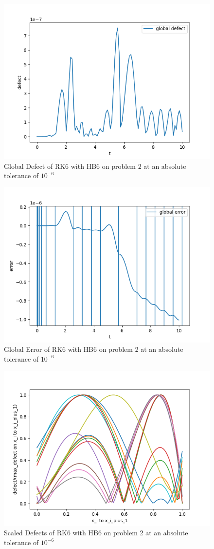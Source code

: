 \documentclass{article}
\begin{document}
\begin{figure}[H]
\centering
\includegraphics[width=0.7\linewidth]{./figures/rk6_with_hb6_p2_global_defect}
\caption{Global Defect of RK6 with HB6 on problem 2 at an absolute tolerance of $10^{-6}$}
\label{fig:rk6_with_hb6_p2_global_defect}
\end{figure}

\begin{figure}[H]
\centering
\includegraphics[width=0.7\linewidth]{./figures/rk6_with_hb6_p2_global_error}
\caption{Global Error of RK6 with HB6 on problem 2 at an absolute tolerance of $10^{-6}$}
\label{fig:rk6_with_hb6_p2_global_error}
\end{figure}

\begin{figure}[H]
\centering
\includegraphics[width=0.7\linewidth]{./figures/rk6_with_hb6_p2_scaled_defects}
\caption{Scaled Defects of RK6 with HB6 on problem 2 at an absolute tolerance of $10^{-6}$}
\label{fig:rk6_with_hb6_p2_scaled_defects}
\end{figure}
\end{document}
